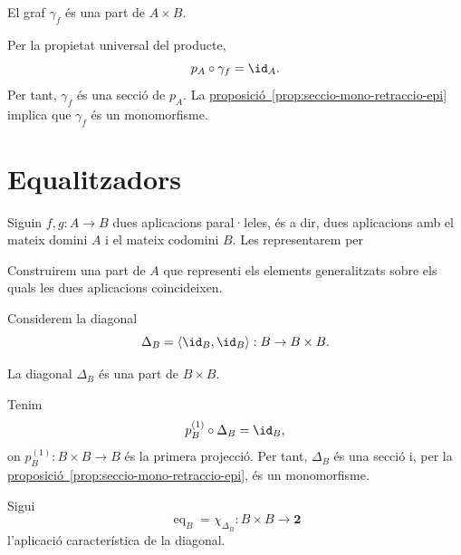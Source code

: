 \begin{proposicio}\label{prop:graf-part}
El graf \(\gamma_f\) és una part de \(A\times B\).
\end{proposicio}

\begin{prova}
Per la propietat universal del producte,
\[
p_A\circ\gamma_f=\id_A.
\]
Per tant, \(\gamma_f\) és una secció de \(p_A\). La \hyperref[prop:seccio-mono-retraccio-epi]{proposició~\ref*{prop:seccio-mono-retraccio-epi}} implica que \(\gamma_f\) és un monomorfisme.
\end{prova}

\section{Equalitzadors}\label{equalitzadors}

Siguin \(f,g:A\to B\) dues aplicacions paral·leles, és a dir, dues aplicacions amb el mateix domini \(A\) i el mateix codomini \(B\). Les representarem per
\begin{center}
\end{center}
Construirem una part de \(A\) que representi els elements generalitzats sobre els quals les dues aplicacions coincideixen.

Considerem la diagonal
\[
\Delta_B=\langle\id_B,\id_B\rangle:B\to B\times B.
\]

\begin{proposicio}\label{prop:diagonal-part}
La diagonal \(\Delta_B\) és una part de \(B\times B\).
\end{proposicio}

\begin{prova}
Tenim
\[
p_B^{(1)}\circ\Delta_B=\id_B,
\]
on \(p_B^{(1)}:B\times B\to B\) és la primera projecció. Per tant, \(\Delta_B\) és una secció i, per la \hyperref[prop:seccio-mono-retraccio-epi]{proposició~\ref*{prop:seccio-mono-retraccio-epi}}, és un monomorfisme.
\end{prova}

Sigui
\[
\operatorname{eq}_B=\chi_{\Delta_B}:B\times B\to\mathbf2
\]
l'aplicació característica de la diagonal.

